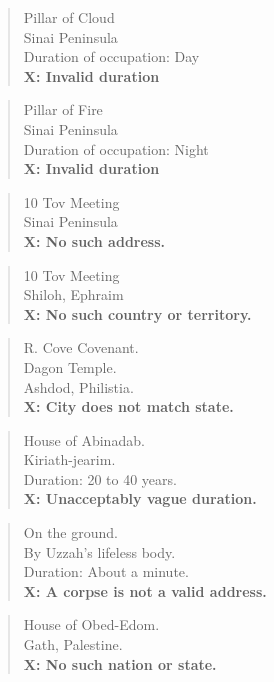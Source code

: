 {{\begin{quote}
Pillar of Cloud\\Sinai Peninsula\\Duration of occupation: Day\\\textbf{X: Invalid duration}
\end{quote}

\begin{quote}
Pillar of Fire\\Sinai Peninsula\\Duration of occupation: Night\\\textbf{X: Invalid duration}
\end{quote}

\begin{quote}
10 Tov Meeting\\Sinai Peninsula\\\textbf{X: No such address.}
\end{quote}

\begin{quote}
10 Tov Meeting\\Shiloh, Ephraim\\\textbf{X: No such country or territory.}
\end{quote}

\begin{quote}
R. Cove Covenant.\\Dagon Temple.\\Ashdod, Philistia.\\\textbf{X: City does not match state.}
\end{quote}

\begin{quote}
House of Abinadab.\\Kiriath-jearim.\\Duration: 20 to 40 years.\\\textbf{X: Unacceptably vague duration.}
\end{quote}

\begin{quote}
On the ground.\\By Uzzah's lifeless body.\\Duration: About a minute.\\\textbf{X: A corpse is not a valid address.}
\end{quote}

\begin{quote}
House of Obed-Edom.\\Gath, Palestine.\\\textbf{X: No such nation or state.}
\end{quote}

}}
